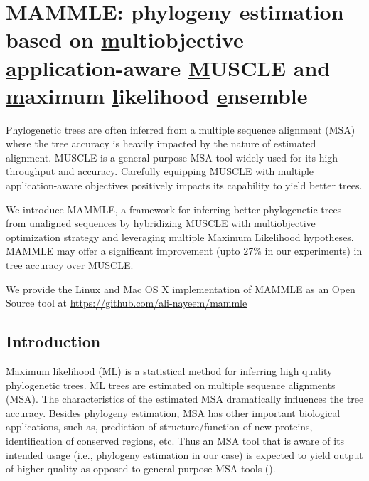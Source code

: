 
\graphicspath{{mammle/}}

\chapter{MAMMLE: phylogeny estimation based on \underline{m}ultiobjective \underline{a}pplication-aware \underline{M}USCLE and \underline{m}aximum \underline{l}ikelihood \underline{e}nsemble} \label{ch:mammle}

Phylogenetic trees are often inferred from a multiple sequence alignment (MSA) where the tree accuracy is heavily impacted by the nature of estimated alignment. MUSCLE is a general-purpose MSA tool widely used for its high throughput and accuracy. Carefully equipping MUSCLE with multiple application-aware objectives positively impacts its capability to yield better trees.

We introduce MAMMLE, a framework for inferring better phylogenetic trees from unaligned sequences by hybridizing MUSCLE with multiobjective optimization strategy and leveraging multiple Maximum Likelihood hypotheses. MAMMLE may offer a significant improvement (upto 27\% in our experiments) in tree accuracy over MUSCLE.

We provide the Linux and Mac OS X implementation of MAMMLE as an Open Source tool at \url{https://github.com/ali-nayeem/mammle}

\section{Introduction}
Maximum likelihood (ML) is a statistical method for inferring high quality phylogenetic trees. ML trees are estimated on multiple sequence alignments (MSA). The characteristics of the estimated MSA dramatically influences the tree accuracy. Besides phylogeny estimation, MSA has other important biological applications, such as, prediction of structure/function of new proteins, identification of conserved regions, etc. Thus an MSA tool that is aware of its intended usage (i.e., phylogeny estimation in our case) is expected to yield output of higher quality as opposed to general-purpose MSA tools (\cite{nayeem2020multiobjective}).  

